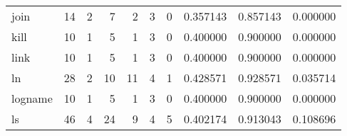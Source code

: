 \begin{longtable}{lrrrrrrrrr}
join      &                                       14 &                                                  2 &                                                  7 &                                                  2 &                                                  3 &                                                  0 &                                           0.357143 &                               0.857143 &                             0.000000 \\
kill      &                                       10 &                                                  1 &                                                  5 &                                                  1 &                                                  3 &                                                  0 &                                           0.400000 &                               0.900000 &                             0.000000 \\
link      &                                       10 &                                                  1 &                                                  5 &                                                  1 &                                                  3 &                                                  0 &                                           0.400000 &                               0.900000 &                             0.000000 \\
ln        &                                       28 &                                                  2 &                                                 10 &                                                 11 &                                                  4 &                                                  1 &                                           0.428571 &                               0.928571 &                             0.035714 \\
logname   &                                       10 &                                                  1 &                                                  5 &                                                  1 &                                                  3 &                                                  0 &                                           0.400000 &                               0.900000 &                             0.000000 \\
ls        &                                       46 &                                                  4 &                                                 24 &                                                  9 &                                                  4 &                                                  5 &                                           0.402174 &                               0.913043 &                             0.108696 \\

\end{longtable}
